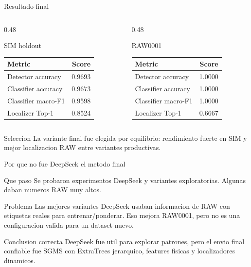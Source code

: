 \documentclass[10pt,aspectratio=169]{beamer}
\begin{document}
\begin{frame}{Resultado final}
\small
\begin{columns}[T,totalwidth=\textwidth]
\begin{column}{0.48\textwidth}
\begin{block}{SIM holdout}
\centering
\begin{tabular}{lr}
\toprule
Metric & Score\\
\midrule
Detector accuracy & 0.9693\\
Classifier accuracy & 0.9673\\
Classifier macro-F1 & 0.9598\\
Localizer Top-1 & 0.8524\\
\bottomrule
\end{tabular}
\end{block}
\end{column}
\begin{column}{0.48\textwidth}
\begin{alertblock}{RAW0001}
\centering
\begin{tabular}{lr}
\toprule
Metric & Score\\
\midrule
Detector accuracy & 1.0000\\
Classifier accuracy & 1.0000\\
Classifier macro-F1 & 1.0000\\
Localizer Top-1 & 0.6667\\
\bottomrule
\end{tabular}
\end{alertblock}
\end{column}
\end{columns}
\vspace{2mm}
\begin{exampleblock}{Seleccion}
La variante final fue elegida por equilibrio: rendimiento fuerte en SIM y mejor localizacion RAW entre variantes productivas.
\end{exampleblock}
\end{frame}

\begin{frame}{Por que no fue DeepSeek el metodo final}
\small
\begin{block}{Que paso}
Se probaron experimentos DeepSeek y variantes exploratorias. Algunas daban numeros RAW muy altos.
\end{block}
\begin{alertblock}{Problema}
Las mejores variantes DeepSeek usaban informacion de RAW con etiquetas reales para entrenar/ponderar. Eso mejora RAW0001, pero no es una configuracion valida para un dataset nuevo.
\end{alertblock}
\begin{exampleblock}{Conclusion correcta}
DeepSeek fue util para explorar patrones, pero el envio final confiable fue SGMS con ExtraTrees jerarquico, features fisicas y localizadores dinamicos.
\end{exampleblock}
\end{frame}
\end{document}
